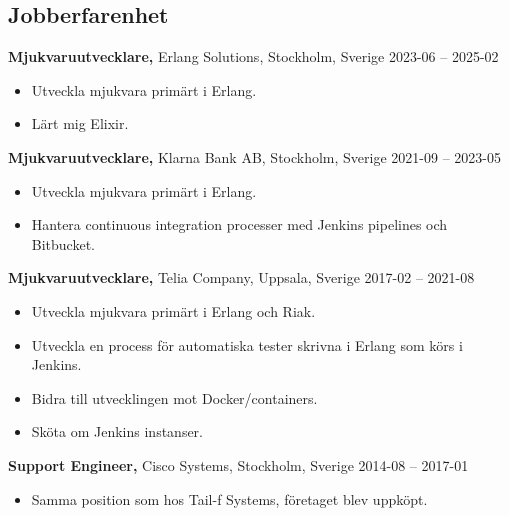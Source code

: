 \documentclass[margin]{res}
\begin{document}

\address{{\bf Kontaktinformation}\\
  
  linkedin.com/in/tommymattsson \\
  github.com/Taddic
}

\address{{\bf Adress}\\
  \\
}

\begin{resume}

\section{Jobberfarenhet}
{\bf Mjukvaruutvecklare,} Erlang Solutions, Stockholm, Sverige \hfill 2023-06 -- 2025-02
 \begin{itemize} \itemsep -2pt  %
 \item Utveckla mjukvara primärt i Erlang.
 \item Lärt mig Elixir.
 \end{itemize}

{\bf Mjukvaruutvecklare,} Klarna Bank AB, Stockholm, Sverige \hfill 2021-09 -- 2023-05
 \begin{itemize} \itemsep -2pt  %
 \item Utveckla mjukvara primärt i Erlang.
 \item Hantera continuous integration processer med Jenkins pipelines och Bitbucket.
 \end{itemize}

{\bf Mjukvaruutvecklare,} Telia Company, Uppsala, Sverige \hfill 2017-02 -- 2021-08
 \begin{itemize} \itemsep -2pt  %
 \item Utveckla mjukvara primärt i Erlang och Riak.
 \item Utveckla en process för automatiska tester skrivna i Erlang som körs i Jenkins.
 \item Bidra till utvecklingen mot Docker/containers.
 \item Sköta om Jenkins instanser.
 \end{itemize}

{\bf Support Engineer,} Cisco Systems, Stockholm, Sverige \hfill 2014-08 -- 2017-01
 \begin{itemize} \itemsep -2pt  %
 \item Samma position som hos Tail-f Systems, företaget blev uppköpt.
 \end{itemize}


\end{resume}
\end{document}
